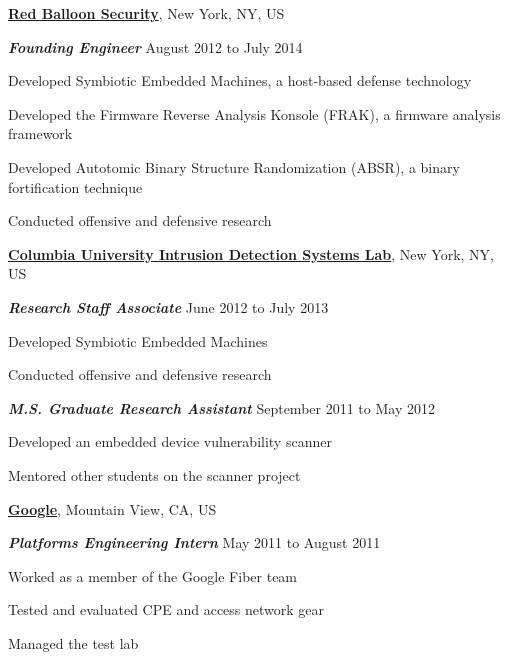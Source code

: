 \documentclass[10pt]{article}
\newenvironment{outerlist}[1][\enskip\textbullet]%
        {\begin{itemize}[#1]}{\end{itemize}%
         \vspace{-.6\baselineskip}}
\newenvironment{innerlist}[1][\enskip\textbullet]%
        {\begin{compactitem}[#1]}{\end{compactitem}}
\newcommand{\blankline}{\quad\pagebreak[2]}
\begin{document}
\blankline

\href{https://redballoonsecurity.com}{\textbf{Red Balloon Security}},
New York, NY, US
\begin{outerlist}
\item[] \textit{\textbf{Founding Engineer}}
  \hfill August 2012 to July 2014
  \begin{innerlist}
  \item Developed Symbiotic Embedded Machines, a host-based defense technology
  \item Developed the Firmware Reverse Analysis Konsole (FRAK), a firmware analysis framework
  \item Developed Autotomic Binary Structure Randomization (ABSR), a binary fortification technique
  \item Conducted offensive and defensive research
  \end{innerlist}
\end{outerlist}

\blankline

\href{http://ids.cs.columbia.edu}{\textbf{Columbia University Intrusion Detection Systems Lab}},
New York, NY, US
\begin{outerlist}
\item[] \textit{\textbf{Research Staff Associate}}
  \hfill June 2012 to July 2013
  \begin{innerlist}
  \item Developed Symbiotic Embedded Machines
  \item Conducted offensive and defensive research
  \end{innerlist}

\item[] \textit{\textbf{M.S. Graduate Research Assistant}}
  \hfill September 2011 to May 2012
  \begin{innerlist}
  \item Developed an embedded device vulnerability scanner
  \item Mentored other students on the scanner project
  \end{innerlist}
\end{outerlist}

\blankline

\href{https://www.google.com}{\textbf{Google}},
Mountain View, CA, US
\begin{outerlist}
\item[] \textit{\textbf{Platforms Engineering Intern}}
  \hfill May 2011 to August 2011
  \begin{innerlist}
  \item Worked as a member of the Google Fiber team
  \item Tested and evaluated CPE and access network gear
  \item Managed the test lab
  \end{innerlist}
\end{outerlist}
\end{document}
